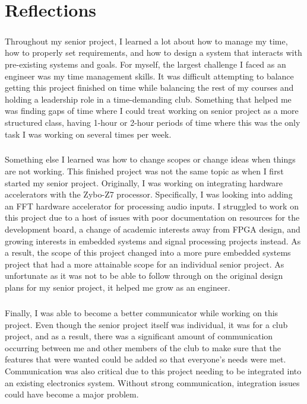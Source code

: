 \chapter{Reflections}

\paragraph{}
Throughout my senior project, I learned a lot about how to manage my time, how to properly set requirements, and how to design a system that interacts with pre-existing systems and goals.
For myself, the largest challenge I faced as an engineer was my time management skills.
It was difficult attempting to balance getting this project finished on time while balancing the rest of my courses and holding a leadership role in a time-demanding club.
Something that helped me was finding gaps of time where I could treat working on senior project as a more structured class, having 1-hour or 2-hour periods of time where this was the only task I was working on several times per week.

\paragraph{}
Something else I learned was how to change scopes or change ideas when things are not working.
This finished project was not the same topic as when I first started my senior project.
Originally, I was working on integrating hardware accelerators with the Zybo-Z7 processor.
Specifically, I was looking into adding an FFT hardware accelerator for processing audio inputs.
I struggled to work on this project due to a host of issues with poor documentation on resources for the development board, a change of academic interests away from FPGA design, and growing interests in embedded systems and signal processing projects instead.
As a result, the scope of this project changed into a more pure embedded systems project that had a more attainable scope for an individual senior project.
As unfortunate as it was not to be able to follow through on the original design plans for my senior project, it helped me grow as an engineer.

\paragraph{}
Finally, I was able to become a better communicator while working on this project.
Even though the senior project itself was individual, it was for a club project, and as a result, there was a significant amount of communication occurring between me and other members of the club to make sure that the features that were wanted could be added so that everyone's needs were met.
Communication was also critical due to this project needing to be integrated into an existing electronics system.
Without strong communication, integration issues could have become a major problem.